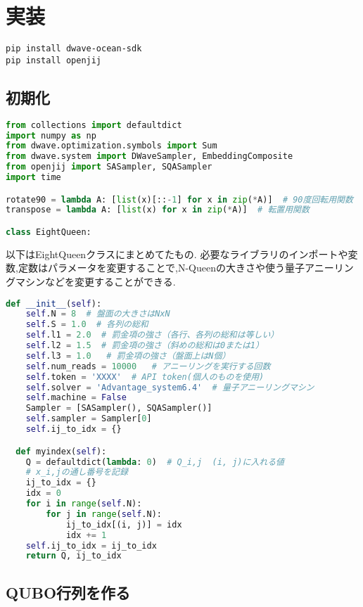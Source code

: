 \documentclass[uplatex,dvipdfmx,a4paper,11pt,oneside,openany]{jsbook}
\begin{document}
\section{実装}

\begin{verbatim}
pip install dwave-ocean-sdk
pip install openjij
\end{verbatim}

\subsection{初期化}

\begin{lstlisting}[language=Python]
from collections import defaultdict
import numpy as np
from dwave.optimization.symbols import Sum
from dwave.system import DWaveSampler, EmbeddingComposite
from openjij import SASampler, SQASampler
import time

rotate90 = lambda A: [list(x)[::-1] for x in zip(*A)]  # 90度回転用関数
transpose = lambda A: [list(x) for x in zip(*A)]  # 転置用関数

class EightQueen:
\end{lstlisting}

以下はEightQueenクラスにまとめてたもの. 必要なライブラリのインポートや変数,定数はパラメータを変更することで,N-Queenの大きさや使う量子アニーリングマシンなどを変更することができる.

\begin{lstlisting}[language=Python]
  def __init__(self):
    self.N = 8  # 盤面の大きさはNxN
    self.S = 1.0  # 各列の総和
    self.l1 = 2.0  # 罰金項の強さ（各行、各列の総和は等しい）
    self.l2 = 1.5  # 罰金項の強さ（斜めの総和は0または1）
    self.l3 = 1.0   # 罰金項の強さ（盤面上はN個）
    self.num_reads = 10000   # アニーリングを実行する回数
    self.token = 'XXXX'  # API token(個人のものを使用)
    self.solver = 'Advantage_system6.4'  # 量子アニーリングマシン
    self.machine = False
    Sampler = [SASampler(), SQASampler()]
    self.sampler = Sampler[0]
    self.ij_to_idx = {}

  def myindex(self):
    Q = defaultdict(lambda: 0)  # Q_i,j  (i, j)に入れる値
    # x_i,jの通し番号を記録
    ij_to_idx = {}
    idx = 0
    for i in range(self.N):
        for j in range(self.N):
            ij_to_idx[(i, j)] = idx
            idx += 1
    self.ij_to_idx = ij_to_idx
    return Q, ij_to_idx
\end{lstlisting}

\subsection{QUBO行列を作る}
\end{document}
